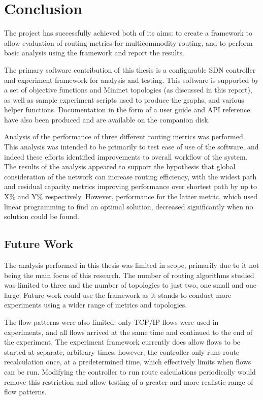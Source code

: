 \chapter{Conclusion}
\label{ch:conclusion}
The project has successfully achieved both of its aims: to create a framework to allow evaluation of routing metrics for multicommodity routing, and to perform basic analysis using the framework and report the results.

The primary software contribution of this thesis is a configurable SDN controller and experiment framework for analysis and testing. This software is supported by a set of objective functions and Mininet topologies (as discussed in this report), as well as sample experiment scripts used to produce the graphs, and various helper functions. Documentation in the form of a user guide and API reference have also been produced and are available on the companion disk.

Analysis of the performance of three different routing metrics was performed. This analysis was intended to be primarily to test ease of use of the software, and indeed these efforts identified improvements to overall workflow of the system. The results of the analysis appeared to support the hypothesis that global consideration of the network can increase routing efficiency, with the widest path and residual capacity metrics improving performance over shortest path by up to X\% and Y\% respectively. However, performance for the latter metric, which used linear programming to find an optimal solution, decreased significantly when no solution could be found.

\section{Future Work}
The analysis performed in this thesis was limited in scope, primarily due to it not being the main focus of this research. The number of routing algorithms studied was limited to three and the number of topologies to just two, one small and one large. Future work could use the framework as it stands to conduct more experiments using a wider range of metrics and topologies.

The flow patterns were also limited: only TCP/IP flows were used in experiments, and all flows arrived at the same time and continued to the end of the experiment. The experiment framework currently does allow flows to be started at separate, arbitrary times; however, the controller only runs route recalculation once, at a predetermined time, which effectively limits when flows can be run. Modifying the controller to run route calculations periodically would remove this restriction and allow testing of a greater and more realistic range of flow patterns.

